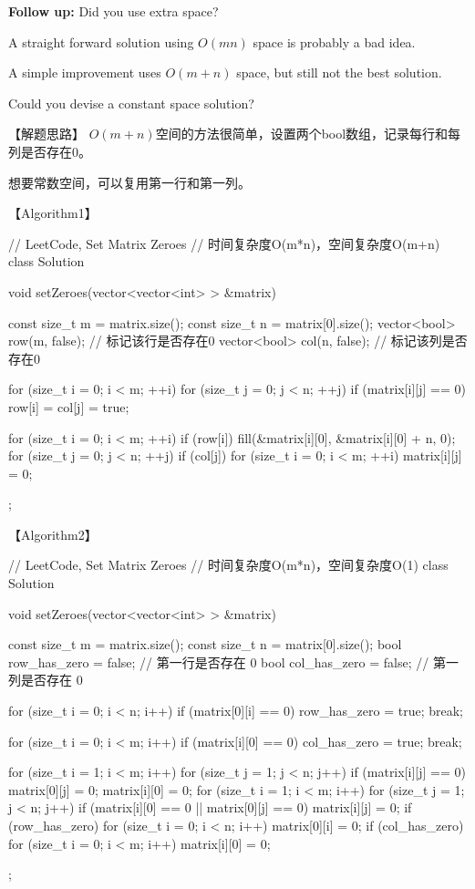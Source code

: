 \textbf{Follow up:}
Did you use extra space?

A straight forward solution using $O(mn)$ space is probably a bad idea.

A simple improvement uses $O(m + n)$ space, but still not the best solution.

Could you devise a constant space solution?


【解题思路】
$O(m+n)$空间的方法很简单，设置两个bool数组，记录每行和每列是否存在0。

想要常数空间，可以复用第一行和第一列。


【Algorithm1】
\begin{Code}
	// LeetCode, Set Matrix Zeroes
	// 时间复杂度O(m*n)，空间复杂度O(m+n)
	class Solution {
		void setZeroes(vector<vector<int> > &matrix) {
			const size_t m = matrix.size();
			const size_t n = matrix[0].size();
			vector<bool> row(m, false); // 标记该行是否存在0
			vector<bool> col(n, false); // 标记该列是否存在0
			
			for (size_t i = 0; i < m; ++i) {
				for (size_t j = 0; j < n; ++j) {
					if (matrix[i][j] == 0)
						row[i] = col[j] = true;
				}
			}
			
			for (size_t i = 0; i < m; ++i) {
				if (row[i])
					fill(&matrix[i][0], &matrix[i][0] + n, 0);
			}
			for (size_t j = 0; j < n; ++j)
				if (col[j])
					for (size_t i = 0; i < m; ++i)
						matrix[i][j] = 0;
		}
	};
\end{Code}


【Algorithm2】
\begin{Code}
	// LeetCode, Set Matrix Zeroes
	// 时间复杂度O(m*n)，空间复杂度O(1)
	class Solution {
		void setZeroes(vector<vector<int> > &matrix) {
			const size_t m = matrix.size();
			const size_t n = matrix[0].size();
			bool row_has_zero = false; // 第一行是否存在 0
			bool col_has_zero = false; // 第一列是否存在 0
			
			for (size_t i = 0; i < n; i++)
				if (matrix[0][i] == 0) {
					row_has_zero = true;
					break;
				}
			
			for (size_t i = 0; i < m; i++)
				if (matrix[i][0] == 0) {
					col_has_zero = true;
					break;
				}
			
			for (size_t i = 1; i < m; i++)
				for (size_t j = 1; j < n; j++)
					if (matrix[i][j] == 0) {
						matrix[0][j] = 0;
						matrix[i][0] = 0;
					}
			for (size_t i = 1; i < m; i++)
				for (size_t j = 1; j < n; j++)
					if (matrix[i][0] == 0 || matrix[0][j] == 0)
						matrix[i][j] = 0;
			if (row_has_zero)
				for (size_t i = 0; i < n; i++)
					matrix[0][i] = 0;
			if (col_has_zero)
				for (size_t i = 0; i < m; i++)
					matrix[i][0] = 0;
		}
	};
\end{Code}


